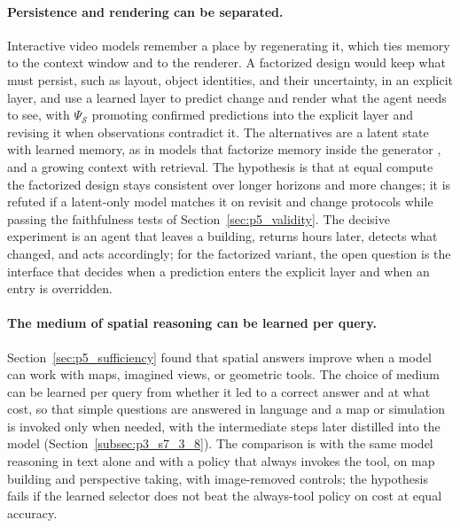 \paragraph{Persistence and rendering can be separated.}
Interactive video models remember a place by regenerating it, which ties memory to the context window and to the renderer.
A factorized design would keep what must persist, such as layout, object identities, and their uncertainty, in an explicit layer, and use a learned layer to predict change and render what the agent needs to see, with $\Psi_{\mathcal{S}}$ promoting confirmed predictions into the explicit layer and revising it when observations contradict it.
The alternatives are a latent state with learned memory, as in models that factorize memory inside the generator \cite{yu2026grome}, and a growing context with retrieval.
The hypothesis is that at equal compute the factorized design stays consistent over longer horizons and more changes; it is refuted if a latent-only model matches it on revisit and change protocols while passing the faithfulness tests of Section~\ref{sec:p5_validity}.
The decisive experiment is an agent that leaves a building, returns hours later, detects what changed, and acts accordingly; for the factorized variant, the open question is the interface that decides when a prediction enters the explicit layer and when an entry is overridden.

\paragraph{The medium of spatial reasoning can be learned per query.}
Section~\ref{sec:p5_sufficiency} found that spatial answers improve when a model can work with maps, imagined views, or geometric tools.
The choice of medium can be learned per query from whether it led to a correct answer and at what cost, so that simple questions are answered in language and a map or simulation is invoked only when needed, with the intermediate steps later distilled into the model (Section~\ref{subsec:p3_s7_3_8}).
The comparison is with the same model reasoning in text alone and with a policy that always invokes the tool, on map building and perspective taking, with image-removed controls; the hypothesis fails if the learned selector does not beat the always-tool policy on cost at equal accuracy.

